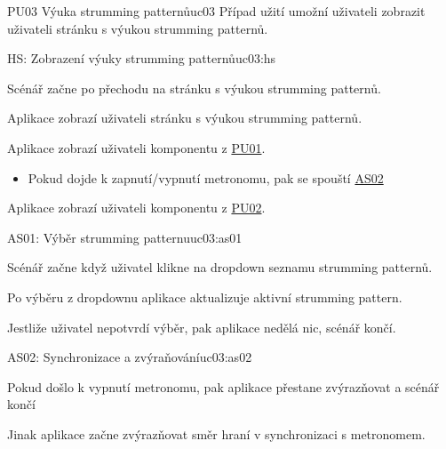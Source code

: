 \begin{usecase}{PU03 Výuka strumming patternů}{uc03}
    Případ užití umožní uživateli zobrazit uživateli stránku s výukou strumming patternů.

    \begin{scenario}{HS: Zobrazení výuky strumming patternů}{uc03:hs}
        \item Scénář začne po přechodu na stránku s výukou strumming patternů.
        \item Aplikace zobrazí uživateli stránku s výukou strumming patternů.
        \item Aplikace zobrazí uživateli komponentu z \hyperref[uc01]{PU01}.
        \begin{itemize}
            \item Pokud dojde k zapnutí/vypnutí metronomu, pak se spouští \hyperref[uc3:as02]{AS02}
        \end{itemize}
        \item Aplikace zobrazí uživateli komponentu z \hyperref[uc02]{PU02}.
    \end{scenario}


    \begin{scenario}{AS01: Výběr strumming patternu}{uc03:as01}
        \item Scénář začne když uživatel klikne na dropdown seznamu strumming patternů.
        \item Po výběru z dropdownu aplikace aktualizuje aktivní strumming pattern.
        \item Jestliže uživatel nepotvrdí výběr, pak aplikace nedělá nic, scénář končí.
            
    \end{scenario}
    
    \begin{scenario}{AS02: Synchronizace a zvýraňování}{uc03:as02}
        \item Pokud došlo k vypnutí metronomu, pak aplikace přestane zvýrazňovat a scénář končí
        \item Jinak aplikace začne zvýrazňovat směr hraní v synchronizaci s metronomem.
    \end{scenario}
\end{usecase}